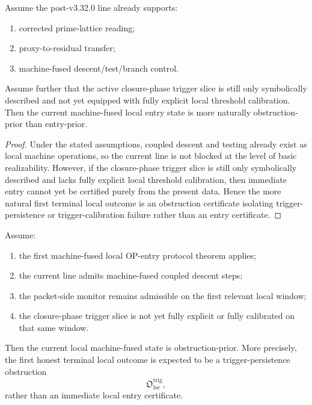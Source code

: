 \begin{proposition}
\label{prop:current-local-state-more-naturally-obstruction-prior}
Assume the post-v3.32.0 line already supports:
\begin{enumerate}
    \item corrected prime-lattice reading;
    \item proxy-to-residual transfer;
    \item machine-fused descent/test/branch control.
\end{enumerate}
Assume further that the active closure-phase trigger slice is still only symbolically described and not yet equipped with fully explicit local threshold calibration.
Then the current machine-fused local entry state is more naturally obstruction-prior than entry-prior.
\end{proposition}

\begin{proof}
Under the stated assumptions, coupled descent and testing already exist as local machine operations, so the current line is not blocked at the level of basic realizability.
However, if the closure-phase trigger slice is still only symbolically described and lacks fully explicit local threshold calibration, then immediate entry cannot yet be certified purely from the present data.
Hence the more natural first terminal local outcome is an obstruction certificate isolating trigger-persistence or trigger-calibration failure rather than an entry certificate.
\end{proof}

\begin{theorem}
\label{thm:first-local-obstruction-priority-theorem}
Assume:
\begin{enumerate}
    \item the first machine-fused local OP-entry protocol theorem applies;
    \item the current line admits machine-fused coupled descent steps;
    \item the packet-side monitor remains admissible on the first relevant local window;
    \item the closure-phase trigger slice is not yet fully explicit or fully calibrated on that same window.
\end{enumerate}
Then the current local machine-fused state is obstruction-prior.
More precisely, the first honest terminal local outcome is expected to be a trigger-persistence obstruction
\[
\mathfrak{O}_{\mathrm{loc}}^{\mathrm{trig}},
\]
rather than an immediate local entry certificate.
\end{theorem}

